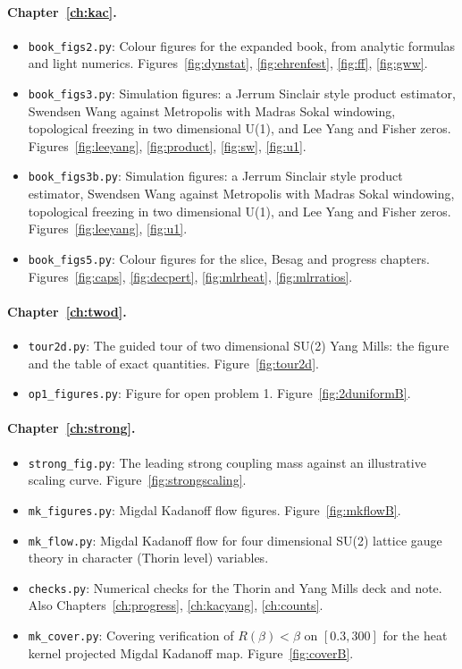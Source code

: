 \paragraph{Chapter~\ref{ch:kac}.}\nopagebreak
\begin{itemize}\setlength{\itemsep}{0pt}\setlength{\parskip}{0pt}
\item \texttt{book\_figs2.py}: Colour figures for the expanded book, from analytic formulas and light numerics. Figures~\ref{fig:dynstat}, \ref{fig:ehrenfest}, \ref{fig:ff}, \ref{fig:gww}.
\item \texttt{book\_figs3.py}: Simulation figures: a Jerrum Sinclair style product estimator, Swendsen Wang against Metropolis with Madras Sokal windowing, topological freezing in two dimensional U(1), and Lee Yang and Fisher zeros. Figures~\ref{fig:leeyang}, \ref{fig:product}, \ref{fig:sw}, \ref{fig:u1}.
\item \texttt{book\_figs3b.py}: Simulation figures: a Jerrum Sinclair style product estimator, Swendsen Wang against Metropolis with Madras Sokal windowing, topological freezing in two dimensional U(1), and Lee Yang and Fisher zeros. Figures~\ref{fig:leeyang}, \ref{fig:u1}.
\item \texttt{book\_figs5.py}: Colour figures for the slice, Besag and progress chapters. Figures~\ref{fig:caps}, \ref{fig:decpert}, \ref{fig:mlrheat}, \ref{fig:mlrratios}.
\end{itemize}
\paragraph{Chapter~\ref{ch:twod}.}\nopagebreak
\begin{itemize}\setlength{\itemsep}{0pt}\setlength{\parskip}{0pt}
\item \texttt{tour2d.py}: The guided tour of two dimensional SU(2) Yang Mills: the figure and the table of exact quantities. Figure~\ref{fig:tour2d}.
\item \texttt{op1\_figures.py}: Figure for open problem 1. Figure~\ref{fig:2duniformB}.
\end{itemize}
\paragraph{Chapter~\ref{ch:strong}.}\nopagebreak
\begin{itemize}\setlength{\itemsep}{0pt}\setlength{\parskip}{0pt}
\item \texttt{strong\_fig.py}: The leading strong coupling mass against an illustrative scaling curve. Figure~\ref{fig:strongscaling}.
\item \texttt{mk\_figures.py}: Migdal Kadanoff flow figures. Figure~\ref{fig:mkflowB}.
\item \texttt{mk\_flow.py}: Migdal Kadanoff flow for four dimensional SU(2) lattice gauge theory in character (Thorin level) variables.
\item \texttt{checks.py}: Numerical checks for the Thorin and Yang Mills deck and note. Also Chapters~\ref{ch:progress}, \ref{ch:kacyang}, \ref{ch:counts}.
\item \texttt{mk\_cover.py}: Covering verification of $R(\beta)<\beta$ on $[0.3,300]$ for the heat kernel projected Migdal Kadanoff map. Figure~\ref{fig:coverB}.
\end{itemize}
